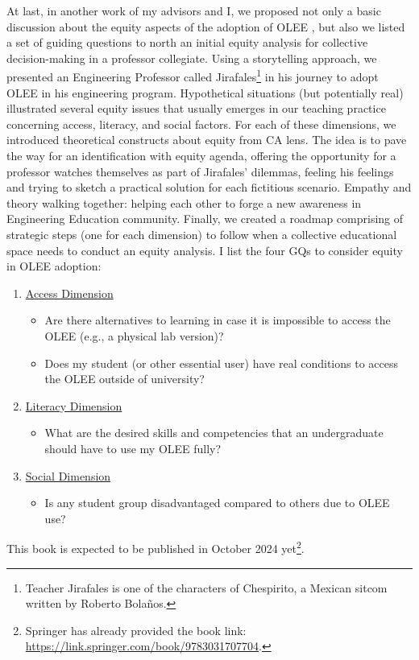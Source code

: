 At last, in another work of my advisors and I, we proposed not only a basic discussion about the equity aspects of the adoption of \acrfull{OLEE} \cite{bispojr:2024-online-lab}, but also we listed a set of guiding questions to north an initial equity analysis for collective decision-making in a professor collegiate. Using a storytelling approach, we presented an Engineering Professor called Jirafales\footnote{Teacher Jirafales is one of the characters of Chespirito, a Mexican sitcom written by Roberto Bolaños.} in his journey to adopt \gls{OLEE} in his engineering program. Hypothetical situations (but potentially real) illustrated several equity issues that usually emerges in our teaching practice concerning access, literacy, and social factors. For each of these dimensions, we introduced theoretical constructs about equity from \gls{CA} lens. The idea is to pave the way for an identification with equity agenda, offering the opportunity for a professor watches themselves as part of Jirafales' dilemmas, feeling his feelings and trying to sketch a practical solution for each fictitious scenario. Empathy and theory walking together: helping each other to forge a new awareness in Engineering Education community. Finally, we created a roadmap comprising of strategic steps (one for each dimension) to follow when a collective educational space needs to conduct an equity analysis. I list the four \glspl{GQ} to consider equity in \gls{OLEE} adoption:
\begin{enumerate}
    \item \underline{Access Dimension}
    \begin{itemize}
        \item[(\gls{GQ}1)] Are there alternatives to learning in case it is impossible to access the OLEE (e.g., a physical lab version)?
        \item[(\gls{GQ}2)] Does my student (or other essential user) have real conditions to access the OLEE outside of university?
    \end{itemize} 
    \item \underline{Literacy Dimension}
    \begin{itemize}
        \item[(\gls{GQ}3)] What are the desired skills and competencies that an undergraduate should have to use my OLEE fully?
    \end{itemize}
    \item \underline{Social Dimension}
    \begin{itemize}
        \item[(\gls{GQ}4)] Is any student group disadvantaged compared to others due to OLEE use?
    \end{itemize}
\end{enumerate}
This book is expected to be published in October 2024 yet\footnote{Springer has already provided the book link: \url{https://link.springer.com/book/9783031707704}.}. 




